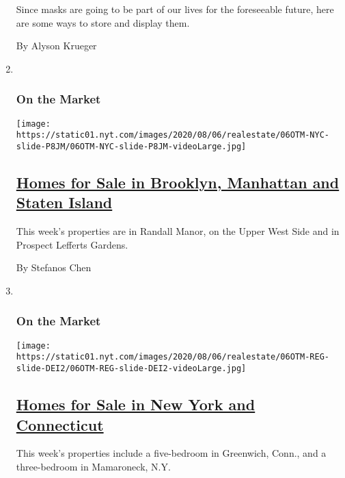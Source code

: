 \begin{enumerate}
  Since masks are going to be part of our lives for the foreseeable
  future, here are some ways to store and display them.

  By Alyson Krueger
\item ~
  \hypertarget{on-the-market}{%
  \subsubsection{On the Market}\label{on-the-market}}

  \texttt{[image: https://static01.nyt.com/images/2020/08/06/realestate/06OTM-NYC-slide-P8JM/06OTM-NYC-slide-P8JM-videoLarge.jpg]}

  \hypertarget{homes-for-sale-in-brooklyn-manhattan-and-staten-island}{%
  \subsection{\texorpdfstring{\href{/2020/08/06/realestate/homes-for-sale-in-brooklyn-manhattan-and-staten-island.html}{Homes
  for Sale in Brooklyn, Manhattan and Staten
  Island}}{Homes for Sale in Brooklyn, Manhattan and Staten Island}}\label{homes-for-sale-in-brooklyn-manhattan-and-staten-island}}

  This week's properties are in Randall Manor, on the Upper West Side
  and in Prospect Lefferts Gardens.

  By Stefanos Chen
\item ~
  \hypertarget{on-the-market-1}{%
  \subsubsection{On the Market}\label{on-the-market-1}}

  \texttt{[image: https://static01.nyt.com/images/2020/08/06/realestate/06OTM-REG-slide-DEI2/06OTM-REG-slide-DEI2-videoLarge.jpg]}

  \hypertarget{homes-for-sale-in-new-york-and-connecticut}{%
  \subsection{\texorpdfstring{\href{/2020/08/06/realestate/homes-for-sale-in-new-york-and-connecticut.html}{Homes
  for Sale in New York and
  Connecticut}}{Homes for Sale in New York and Connecticut}}\label{homes-for-sale-in-new-york-and-connecticut}}

  This week's properties include a five-bedroom in Greenwich, Conn., and
  a three-bedroom in Mamaroneck, N.Y.


\end{enumerate}
